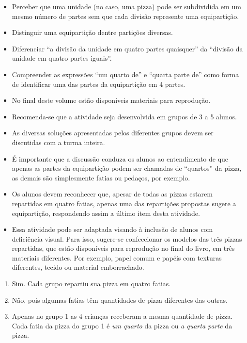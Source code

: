 \begin{atividade}\label{chap1-ativ2}
\objetivos
\begin{itemize} %
    \item       Perceber que uma unidade (no caso, uma pizza) pode ser subdividida em um mesmo número de partes sem que cada divisão represente uma equipartição.
    \item       Distinguir uma equipartição dentre partições diversas.
    \item       Diferenciar       ``a divisão da unidade em quatro partes quaisquer'' da       ``divisão da unidade em quatro partes iguais''.
    \item       Compreender as expressões ``um quarto de'' e ``quarta parte de'' como forma de identificar uma das partes da equipartição em 4 partes.
\end{itemize} %

\discussoes
  \begin{itemize} %
    \item No final deste volume estão disponíveis materiais para reprodução.
    \item Recomenda-se que a atividade seja desenvolvida em grupos de 3 a 5 alunos.
    \item As diversas soluções apresentadas pelos diferentes grupos devem ser discutidas com a turma inteira.
    \item É importante que a discussão conduza os alunos ao entendimento de que apenas as partes da equipartição podem ser chamadas de ``quartos'' da pizza, as demais são simplesmente fatias ou pedaços, por exemplo.
    \item Os alunos devem reconhecer que, apesar de todas as pizzas estarem repartidas em quatro fatias, apenas uma das repartições propostas sugere a equipartição, respondendo assim a último item desta atividade.
    \item       Essa atividade pode ser adaptada visando à inclusão de alunos com deficiência visual. Para isso, sugere-se confeccionar os modelos das três pizzas repartidas, que estão disponíveis para reprodução no final do livro, em três materiais diferentes. Por exemplo, papel comum e papéis com texturas diferentes, tecido ou material emborrachado.
\end{itemize} %

\solucao
\begin{enumerate}
    \item       Sim. Cada grupo repartiu sua pizza em quatro fatias.
    \item       Não, pois algumas fatias têm quantidades de pizza diferentes das outras.
    \item       Apenas no grupo 1 as 4 crianças receberam a mesma quantidade de pizza. Cada fatia da pizza do grupo 1 é {\itshape um quarto} da pizza ou {\itshape a quarta parte} da pizza.
\end{enumerate} %
\end{atividade}

